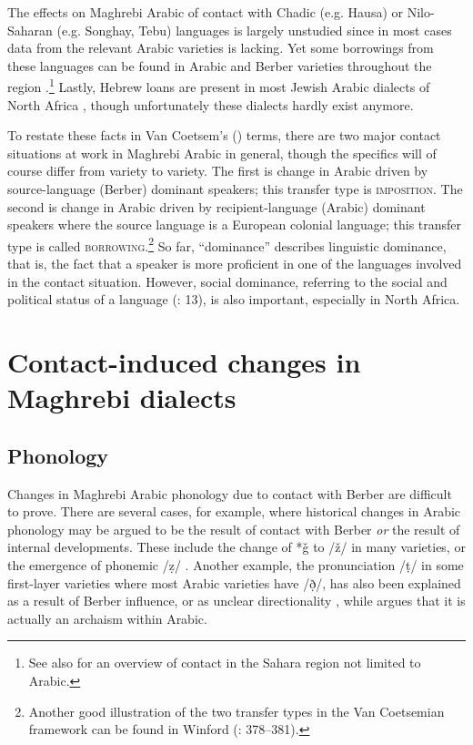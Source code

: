 \documentclass[output=paper]{langsci/langscibook}
\begin{document}
  The effects on Maghrebi Arabic of contact with Chadic (e.g. Hausa) or Nilo-Saharan (e.g. Songhay, Tebu) languages is largely unstudied since in most cases data from the relevant Arabic varieties is lacking. Yet some borrowings from these languages can be found in Arabic and Berber varieties throughout the region \citep{Souag2013lexical}.\footnote{See also \citet{Souag2016sahara} for an overview of contact in the Sahara region not limited to Arabic.} Lastly, Hebrew loans are present in most Jewish Arabic dialects of North Africa \citep{Yoda2013}, though unfortunately these dialects hardly exist anymore.

  To restate these facts in Van Coetsem’s (\citeyear{VanCoetsem1988,VanCoetsem2000}) terms, there are two major contact situations at work in Maghrebi Arabic in general, though the specifics will of course differ from variety to variety. The first is change in Arabic driven by source-language (Berber) dominant speakers; this transfer type is \textsc{imposition}. The second is change in Arabic driven by recipient-language (Arabic) dominant speakers where the source language is a European colonial language; this transfer type is called \textsc{borrowing}.\footnote{Another good illustration of the two transfer types in the Van Coetsemian framework can be found in Winford (\citeyear{Winford2005}: 378–381).} So far, ``dominance'' describes linguistic dominance, that is, the fact that a speaker is more proficient in one of the languages involved in the contact situation. However, social dominance, referring to the social and political status of a language (\citealt{VanCoetsem1988}: 13), is also important, especially in North Africa.

\section{ Contact-induced changes in Maghrebi dialects}

\subsection{ Phonology}

Changes in Maghrebi Arabic phonology due to contact with Berber are difficult to prove. There are several cases, for example, where historical changes in Arabic phonology may be argued to be the result of contact with Berber \textit{or} the result of internal developments. These include the change of *ǧ to /ž/ in many varieties, or the emergence of phonemic /ẓ/ \citep{Souag2016sahara}. Another example, the pronunciation /ṭ/ in some first-layer varieties where most Arabic varieties have /ð̣/, has also been explained as a result of Berber influence, or as unclear directionality \citep[187]{Kossmann2013book}, while \citet{Al-Jallad2015Maghreb} argues that it is actually an archaism within Arabic.
\end{document}

